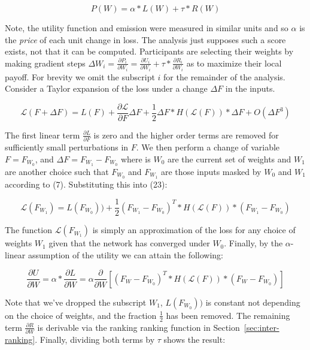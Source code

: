 \documentclass{article}
\begin{document}
\begin{equation}
P(W) = \alpha * L(W) + \tau * R(W)
\end{equation}
\smallskip

Note, the utility function and emission were measured in similar units and so $\alpha$ is the \textit{price} of each unit change in loss. The analysis just supposes such a score exists, not that it can be computed. Participants are selecting their weights by making gradient steps $\Delta W_i = \frac{\partial P_i}{\partial W_i} = \frac{\partial U_i}{\partial W_i} + \tau * \frac{\partial R_i}{\partial W_i}$ as to maximize their local payoff. For brevity we omit the subscript $i$ for the remainder of the analysis. Consider a Taylor expansion of the loss under a change $\Delta F$ in the inputs.

\begin{equation}
\mathcal{L}(F + \Delta F) = L(F) + \frac{\partial \mathcal{L}}{\partial F} \Delta F + \frac{1}{2} \Delta F * H( \mathcal{L} (F) ) * \Delta F + O(\Delta F^3) 
\end{equation}

The first linear term $\frac{\partial L}{\partial F}$ is zero and the higher order terms are removed for sufficiently small perturbations in $F$. We then perform a change of variable $F = F_{W_0}$, and $\Delta F = F_{W_1} - F_{W_0}$ where is $W_0$ are the current set of weights and $W_1$ are another choice such that $F_{W_0}$ and $F_{W_1}$ are those inputs masked by $W_0$ and $W_1$ according to (7). Substituting this into (23):

\begin{equation}
\mathcal{L}(F_{W_1}) = L(F_{W_0})) + \frac{1}{2} (F_{W_1} - F_{W_0})^T * H( \mathcal{L}(F)) * (F_{W_1} - F_{W_0}) 
\end{equation}

The function $\mathcal{L}(F_{W_1})$ is simply an approximation of the loss for any choice of weights $W_1$ given that the network has converged under $W_0$. Finally, by the $\alpha$-linear assumption of the utility we can attain the following: 

\begin{equation}
\frac{\partial U}{\partial W} = \alpha * \frac{\partial L}{\partial W} = \alpha \frac{\partial}{\partial W} [(F_W - F_{W_0})^T * H( \mathcal{L}(F)) * (F_W - F_{W_0}) ]
\end{equation}

Note that we've dropped the subscript $W_1$,  $L(F_{W_0}))$ is constant not depending on the choice of weights, and the fraction $\frac{1}{2}$ has been removed. The remaining term $\frac{\partial R}{\partial W}$ is derivable via the ranking ranking function in Section~\ref{sec:inter-ranking}.  Finally, dividing both terms by $\tau$ shows the result:
\end{document}
